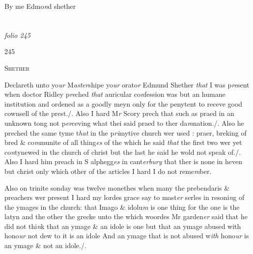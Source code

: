 \documentclass[12pt, a4paper]{book}
\begin{document}
		\ifthenelse{\isodd{\thepage}}
		{\reversemarginpar}
		{\normalmarginpar}
		By me Edmo\textit{n}d shether

\dotfill
						\newpage {} \section*{}

\textit{folio 245}



\begin{flushright}{\color{Mahogany}245}\end{flushright}

				\begin{center} \begin{large} {\scshape Shether} \end{large} \end{center}
			
            		
		\ifthenelse{\isodd{\thepage}}
		{\reversemarginpar}
		{\normalmarginpar}
		Declareth unto yo\textit{ur} M\textit{aster}shipe yo\textit{ur} orato\textit{r} Edmund Shether \textit{that} I was p\textit{re}sent
            			when doctor Ridley p\textit{re}ched \textit{that} auricular co\textit{n}fession was but an humane
institution and ordened as a goodly meyn only for the penytent to 
receve good cownsell of the prest./. Also I hard M\textit{r }Scory prech that
such as praed in an unknown tong not p\textit{er}ceving what thei said
praed to ther da\textit{m}nation./. Also he preched the same tyme t\textit{hat} in the 
p\textit{ri}mytive church wer used : praer, breking of bred \& co\textit{m}munite 
of all thing\textit{es} of the which he said \textit{that} the first two wer yet co\textit{n}tynewed in the church of christ but the last he said he wold not 
speak of./. Also I hard him preach in S alphegg\textit{es} in cant\textit{erbury} that ther
is none in heven but christ only which other of the articles
I hard I do not reme\textit{m}ber.

		\ifthenelse{\isodd{\thepage}}
		{\reversemarginpar}
		{\normalmarginpar}
		Also on trinite sonday was twelve monethes when many the
	prebendaris \& preachers wer present I hard my lordes grace say
to mast\textit{er} serles in resoni\textit{n}g of the ymages in the church: that 
Imago \& idolu\textit{m} is one thing for the one is the latyn and the other
the grecke unto the which woordes Mr garden\textit{er} said that he did not thi\textit{n}k
that an ymage \& an idole is one but that an ymage abused with 
hono\textit{ur} not dew to it is an idole And an ymage that is not abused 
w\textit{ith} hono\textit{ur} is an ymage \& not an idole./. 
            		
\end{document}
